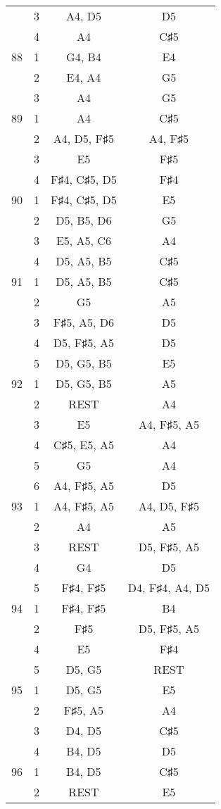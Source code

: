 \documentclass{article}
\begin{document}
\begin{longtable}{|c|c|c|c|}
  & 3 & A4, D5 & D5 \\ 
  & 4 & A4 & C♯5 \\ 
\hline
88 & 1 & G4, B4 & E4 \\ 
  & 2 & E4, A4 & G5 \\ 
  & 3 & A4 & G5 \\ 
\hline
89 & 1 & A4 & C♯5 \\ 
  & 2 & A4, D5, F♯5 & A4, F♯5 \\ 
  & 3 & E5 & F♯5 \\ 
  & 4 & F♯4, C♯5, D5 & F♯4 \\ 
\hline
90 & 1 & F♯4, C♯5, D5 & E5 \\ 
  & 2 & D5, B5, D6 & G5 \\ 
  & 3 & E5, A5, C6 & A4 \\ 
  & 4 & D5, A5, B5 & C♯5 \\ 
\hline
91 & 1 & D5, A5, B5 & C♯5 \\ 
  & 2 & G5 & A5 \\ 
  & 3 & F♯5, A5, D6 & D5 \\ 
  & 4 & D5, F♯5, A5 & D5 \\ 
  & 5 & D5, G5, B5 & E5 \\ 
\hline
92 & 1 & D5, G5, B5 & A5 \\ 
  & 2 & REST & A4 \\ 
  & 3 & E5 & A4, F♯5, A5 \\ 
  & 4 & C♯5, E5, A5 & A4 \\ 
  & 5 & G5 & A4 \\ 
  & 6 & A4, F♯5, A5 & D5 \\ 
\hline
93 & 1 & A4, F♯5, A5 & A4, D5, F♯5 \\ 
  & 2 & A4 & A5 \\ 
  & 3 & REST & D5, F♯5, A5 \\ 
  & 4 & G4 & D5 \\ 
  & 5 & F♯4, F♯5 & D4, F♯4, A4, D5 \\ 
\hline
94 & 1 & F♯4, F♯5 & B4 \\ 
  & 2 & F♯5 & D5, F♯5, A5 \\ 
  & 4 & E5 & F♯4 \\ 
  & 5 & D5, G5 & REST \\ 
\hline
95 & 1 & D5, G5 & E5 \\ 
  & 2 & F♯5, A5 & A4 \\ 
  & 3 & D4, D5 & C♯5 \\ 
  & 4 & B4, D5 & D5 \\ 
\hline
96 & 1 & B4, D5 & C♯5 \\ 
  & 2 & REST & E5 \\ 

\end{longtable}
\end{document}
